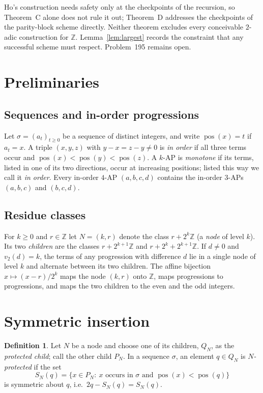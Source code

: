 \documentclass[11pt]{amsart}
\theoremstyle{definition}
\newtheorem{definition}[theorem]{Definition}
\theoremstyle{remark}
\newcommand{\Z}{\mathbb{Z}}
\newcommand{\pos}{\operatorname{pos}}
\begin{document}
Ho's construction needs safety only at the checkpoints of the recursion, so Theorem~C alone does not rule it out; Theorem~D addresses the checkpoints of the parity-block scheme directly. Neither theorem excludes every conceivable $2$-adic construction for $\Z$. Lemma~\ref{lem:largest} records the constraint that any successful scheme must respect. Problem~195 remains open.

\section{Preliminaries}\label{sec:prelim}

\subsection{Sequences and in-order progressions}
Let $\sigma=(a_t)_{t\ge0}$ be a sequence of distinct integers, and write $\pos(x)=t$ if $a_t=x$. A triple $(x,y,z)$ with $y-x=z-y\ne0$ is \emph{in order} if all three terms occur and $\pos(x)<\pos(y)<\pos(z)$. A $k$-AP is \emph{monotone} if its terms, listed in one of its two directions, occur at increasing positions; listed this way we call it \emph{in order}. Every in-order $4$-AP $(a,b,c,d)$ contains the in-order $3$-APs $(a,b,c)$ and $(b,c,d)$.

\subsection{Residue classes}
For $k\ge0$ and $r\in\Z$ let $N=(k,r)$ denote the class $r+2^k\Z$ (a \emph{node} of level $k$). Its two \emph{children} are the classes $r+2^{k+1}\Z$ and $r+2^k+2^{k+1}\Z$. If $d\ne0$ and $v_2(d)=k$, the terms of any progression with difference $d$ lie in a single node of level $k$ and alternate between its two children. The affine bijection $x\mapsto (x-r)/2^k$ maps the node $(k,r)$ onto $\Z$, maps progressions to progressions, and maps the two children to the even and the odd integers.

\section{Symmetric insertion}\label{sec:sym}

\begin{definition}\label{def:prot}
Let $N$ be a node and choose one of its children, $Q_N$, as the \emph{protected child}; call the other child $P_N$. In a sequence $\sigma$, an element $q\in Q_N$ is \emph{$N$-protected} if the set
\[
S_N(q)=\{x\in P_N:\ x \text{ occurs in }\sigma\text{ and }\pos(x)<\pos(q)\}
\]
is symmetric about $q$, i.e.\ $2q-S_N(q)=S_N(q)$.
\end{definition}
\end{document}
